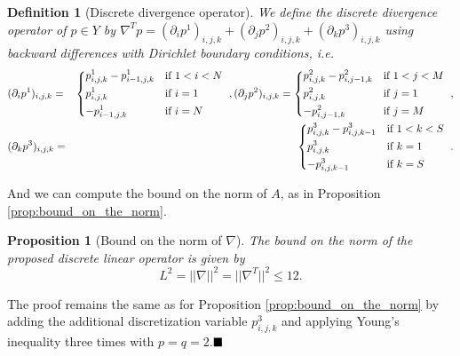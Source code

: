 \documentclass[abstracton]{scrreprt}
\newcommand{\qed}{$\hfill\blacksquare$}
\newtheorem{proposition}[theorem]{Proposition}
\newtheorem{definition}[theorem]{Definition}
\newenvironment{proof}[1][Proof]{\begin{trivlist}
\item[\hskip \labelsep {\bfseries #1}]}{\end{trivlist}}
\begin{document}
        \begin{definition}[Discrete divergence operator] %
        \label{def:discrete_divergence_operator_ms}
            We define the discrete divergence operator of $p \in Y$ by $\nabla^{T} p = (\partial_{i}p^{1})_{i, j, k} + (\partial_{j}p^{2})_{i, j, k} + (\partial_{k}p^{3})_{i, j, k}$ using backward differences with Dirichlet boundary conditions, i.e.
                \begin{eqnarray}
                    &(\partial_{i}p^{1})_{i, j, k} =&
                        \begin{dcases*}
                            p^{1}_{i, j, k} - p^{1}_{i-1, j, k} & \textnormal{if $1 < i < N$} \\
                            p^{1}_{i, j, k} & \textnormal{if $i = 1$} \\
                            -p^{1}_{i-1, j, k} & \textnormal{if $i = N$}
                        \end{dcases*},
                    \notag
                    (\partial_{j}p^{2})_{i, j, k} =
                        \begin{dcases*}
                            p^{2}_{i, j, k} - p^{2}_{i, j-1, k} & \textnormal{if $1 < j < M$} \\
                            p^{2}_{i, j, k} & \textnormal{if $j = 1$} \\
                            -p^{2}_{i, j-1, k} & \textnormal{if $j = M$}
                        \end{dcases*},
                    \notag \\
                    &(\partial_{k}p^{3})_{i, j, k} =&
                        \begin{dcases*}
                            p^{3}_{i, j, k} - p^{3}_{i, j, k-1} & \textnormal{if $1 < k < S$} \\
                            p^{3}_{i, j, k} & \textnormal{if $k = 1$} \\
                            -p^{3}_{i, j, k-1} & \textnormal{if $k = S$}
                        \end{dcases*}.
                    \notag
                \end{eqnarray}
        \end{definition}
        And we can compute the bound on the norm of $A$, as in Proposition \ref{prop:bound_on_the_norm}.
        \begin{proposition}[Bound on the norm of $\nabla$] %
            \label{prop:bound_on_the_norm_ms}
            The bound on the norm of the proposed discrete linear operator is given by
                $$
                    L^{2} = ||\nabla||^{2} = ||\nabla^{T}||^{2} \le 12.
                $$
        \end{proposition}
        \begin{proof}
        	The proof remains the same as for Proposition \ref{prop:bound_on_the_norm} by adding the additional discretization variable $p^{3}_{i,j,k}$ and applying Young's inequality three times with $p = q = 2$.\qed
        \end{proof}
\end{document}
